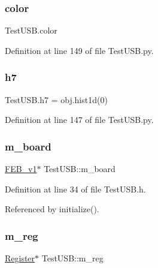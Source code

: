 \subsubsection{\texorpdfstring{color}{color}}
{\footnotesize\ttfamily Test\+U\+S\+B.\+color}



Definition at line 149 of file Test\+U\+S\+B.\+py.

\mbox{\label{classTestUSB_a18ac9c994c85be08fa09d6b3b1cb4446}} 
\subsubsection{\texorpdfstring{h7}{h7}}
{\footnotesize\ttfamily Test\+U\+S\+B.\+h7 = obj.\+hist1d(0)}



Definition at line 147 of file Test\+U\+S\+B.\+py.

\mbox{\label{classTestUSB_ab4a5317f74feb30410d4c1ad75ad192c}} 
\subsubsection{\texorpdfstring{m\+\_\+board}{m\_board}}
{\footnotesize\ttfamily \hyperlink{classFEB__v1}{F\+E\+B\+\_\+v1}$\ast$ Test\+U\+S\+B\+::m\+\_\+board\hspace{0.3cm}{\ttfamily [private]}}



Definition at line 34 of file Test\+U\+S\+B.\+h.



Referenced by initialize().

\mbox{\label{classTestUSB_a5f2bd3ef5db056bcfd803cb94d3a6587}} 
\subsubsection{\texorpdfstring{m\+\_\+reg}{m\_reg}}
{\footnotesize\ttfamily \hyperlink{classRegister}{Register}$\ast$ Test\+U\+S\+B\+::m\+\_\+reg\hspace{0.3cm}{\ttfamily [private]}}



